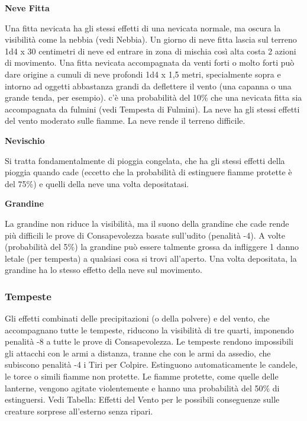 \documentclass[a4paper,11pt,twoside,openany]{book}
\begin{document}
{\textbf{Neve Fitta}

Una fitta nevicata ha gli stessi effetti di una nevicata normale, ma oscura la visibilità come la nebbia (vedi Nebbia). Un giorno di neve fitta lascia sul terreno 1d4 x 30 centimetri di neve ed entrare in zona di mischia così alta costa 2 azioni di movimento. Una fitta nevicata accompagnata da venti forti o molto forti può dare origine a cumuli di neve profondi 1d4 x 1,5 metri, specialmente sopra e intorno ad oggetti abbastanza grandi da deflettere il vento (una capanna o una grande tenda, per esempio).
c'è una probabilità del 10\% che una nevicata fitta sia accompagnata da fulmini (vedi Tempesta di Fulmini). La neve ha gli stessi effetti del vento moderato sulle fiamme. La neve rende il terreno difficile.

\textbf{Nevischio}

Si tratta fondamentalmente di pioggia congelata, che ha gli stessi effetti della pioggia quando cade (eccetto che la probabilità di estinguere fiamme protette è del 75\%) e quelli della neve una volta depositatasi.

\textbf{Grandine}

La grandine non riduce la visibilità, ma il suono della grandine che cade rende più difficili le prove di Consapevolezza basate sull'udito (penalità -4). A volte (probabilità del 5\%) la grandine può essere talmente grossa da infliggere 1 danno letale (per tempesta) a qualsiasi cosa si trovi all'aperto. Una volta depositata, la grandine ha lo stesso effetto della neve sul movimento.

\subsubsection{Tempeste}

\label{tempeste}

Gli effetti combinati delle precipitazioni (o della polvere) e del vento, che accompagnano tutte le tempeste, riducono la visibilità di tre quarti, imponendo penalità -8 a tutte le prove di Consapevolezza. Le tempeste rendono impossibili gli attacchi con le armi a distanza, tranne che con le armi da assedio, che subiscono penalità -4 i Tiri per Colpire.
Estinguono automaticamente le candele, le torce o simili fiamme non protette. Le fiamme protette, come quelle delle lanterne, vengono agitate violentemente e hanno una probabilità del 50\% di estinguersi. Vedi Tabella: Effetti del Vento per le possibili conseguenze sulle creature sorprese all'esterno senza ripari. 

}
\end{document}
